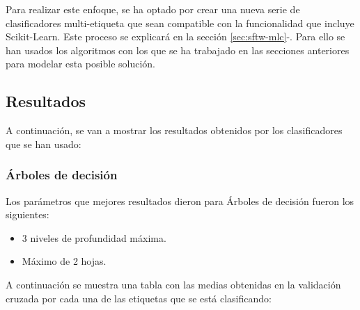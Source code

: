 Para realizar este enfoque, se ha optado por crear una nueva serie de clasificadores multi-etiqueta que sean compatible con la funcionalidad que incluye Scikit-Learn. Este proceso se explicará en la sección \ref{sec:sftw-mlc}-. Para ello se han usados los algoritmos con los que se ha trabajado en las secciones anteriores para modelar esta posible solución.
\subsection{Resultados}
A continuación, se van a mostrar los resultados obtenidos por los clasificadores que se han usado:
\subsubsection*{Árboles de decisión}
Los parámetros que mejores resultados dieron para Árboles de decisión fueron los siguientes:
\begin{itemize}
	\item 3 niveles de profundidad máxima.
	\item Máximo de 2 hojas.
\end{itemize}
A continuación se muestra una tabla con las medias obtenidas en la validación cruzada por cada una de las etiquetas que se está clasificando:
